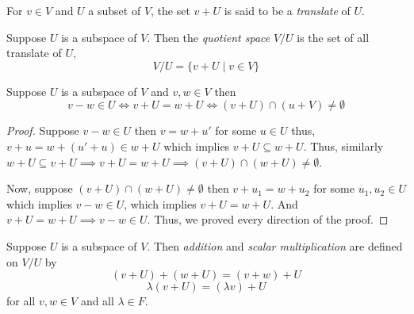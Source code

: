 \begin{definition}
    For $v \in V$ and $U$ a subset of $V$, the set $v+U$ is said to be a \textit{translate} of $U$.
\end{definition}

\begin{definition}
    Suppose $U$ is a subspace of $V$. Then the \textit{quotient space} $V/U$ is the set of all translate of $U$,
    \[ V/U = \{ v+ U \mid v \in V \} \]
\end{definition}

\begin{proposition}
    Suppose $U$ is a subspace of $V$ and $v,w \in V$ then
    \[ v-w \in U \iff v+U = w + U \iff (v+U) \cap (u+V) \neq \emptyset \] 
\end{proposition}

\begin{proof}
    Suppose $v-w \in U$ then $v=w+u'$ for some $u \in U$ thus, $v+u = w+(u'+u) \in w + U$ which implies $v+U \subseteq w+U$.
    Thus, similarly $w+U \subseteq v+U \implies v+U = w+U \implies (v+U) \cap (w+U) \neq \emptyset$.

    Now, suppose $(v+U) \cap (w+U) \neq \emptyset$ then $v+u_1 = w+u_2$ for some $u_1,u_2 \in U$ which implies $v-w \in U$, which implies 
    $v+U=w+U$. And $v+U = w+U \implies v-w \in U$. Thus, we proved every direction of the proof.
\end{proof}

\begin{definition}
    Suppose $U$ is a subspace of $V$. Then \textit{addition} and \textit{scalar multiplication} are defined on $V/U$ by
    \[ (v+U)+(w+U) = (v+w)+U\]
    \[ \lambda(v+U) = (\lambda v) + U \]
    for all $v, w \in V$ and all $\lambda \in F$.
\end{definition}
